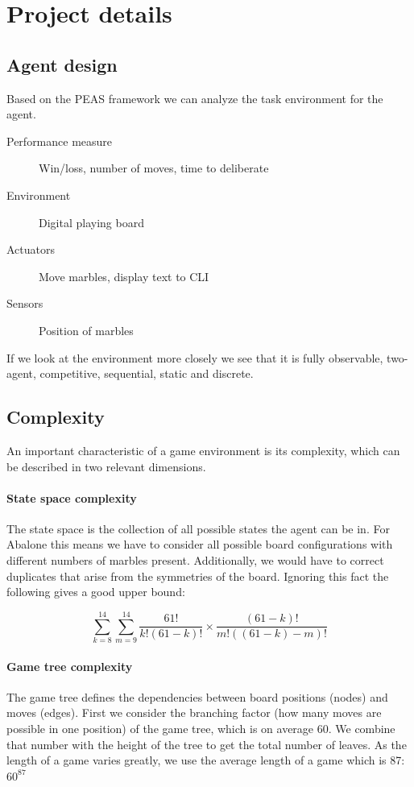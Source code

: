 \documentclass{../lib/llncs}
\begin{document}
\section{Project details}

\subsection{Agent design}

Based on the PEAS framework we can analyze the task environment for the agent. \cite[p.107]{russell_artificial_2021}

\begin{description}
	\item[Performance measure] Win/loss, number of moves, time to deliberate
	\item[Environment] Digital playing board
	\item[Actuators] Move marbles, display text to CLI
	\item[Sensors] Position of marbles
\end{description}

If we look at the environment more closely we see that it is fully observable, two-agent, competitive, sequential, static and discrete.

\subsection{Complexity}
An important characteristic of a game environment is its complexity, which can be described in two relevant dimensions.

\paragraph{State space complexity}

The state space is the collection of all possible states the agent can be in.\cite[p. 150]{russell_artificial_2021} For Abalone this means we have to consider all possible board configurations with different numbers of marbles present. Additionally, we would have to correct duplicates that arise from the symmetries of the board. Ignoring this fact the following gives a good upper bound:

$$
	\sum_{k=8}^{14}\sum_{m=9}^{14}\frac{61!}{k!(61-k)!}\times\frac{(61-k)!}{m!((61-k)-m)!}
$$

\paragraph{Game tree complexity} The game tree defines the dependencies between board positions (nodes) and moves (edges). First we consider the branching factor (how many moves are possible in one position) of the game tree, which is on average 60. We combine that number with the height of the tree to get the total number of leaves. As the length of a game varies greatly, we use the average length of a game which is 87: $60^{87}$ \cite{lemmens_constructing_2005}
\end{document}

